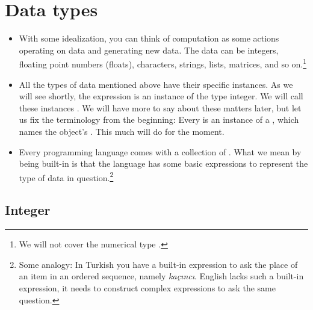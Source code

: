 \documentclass[a4paper]{article}
\begin{document}
\section{Data types}

\begin{itemize}

\item With some idealization, you can think of computation as some actions
operating on data and generating new data. The data can be integers, floating
point numbers (floats), characters, strings, lists, matrices, and so
on.\footnote{We will not cover the numerical type .}

\item All the types of data mentioned above have their specific instances. As we
will see shortly, the expression  is an instance of the type integer. We
will call these instances . We will have more to say about these
matters later, but let us fix the terminology from the beginning: Every
 is an instance of a , which names the object's
. This much will do for the moment. 

\item Every programming language comes with a collection of . What we mean by being built-in is that the language has some basic
expressions to represent the type of data in question.\footnote{Some analogy: In
Turkish you have a built-in expression to ask the place of an item in an ordered
sequence, namely \emph{ka\c c\i{}nc\i{}}. English lacks such a built-in
expression, it needs to construct complex expressions to ask the same question.}

\end{itemize}

\subsection{Integer}
\end{document}
